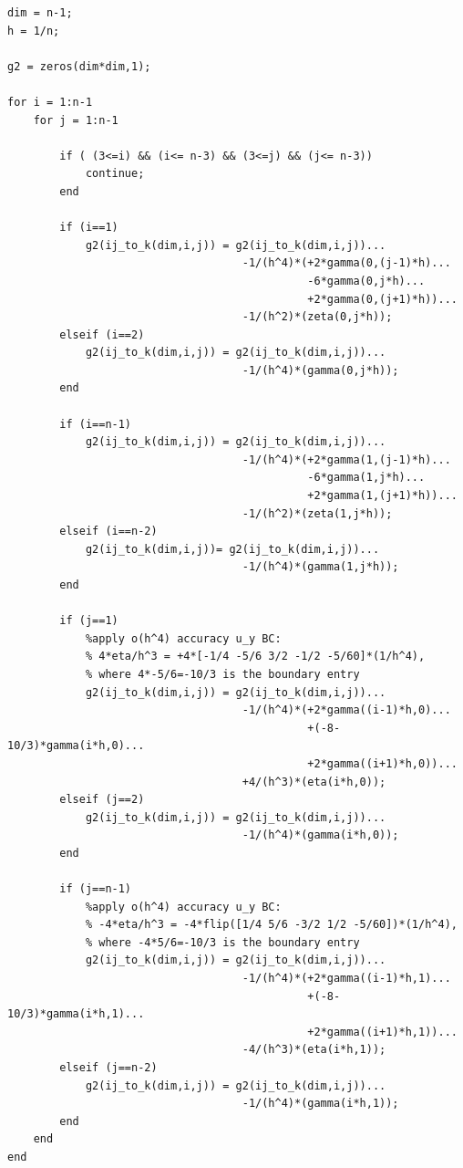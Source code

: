 \documentclass[12pt,letter]{article}
\begin{document}
\begin{enumerate}
\begin{enumerate}
\begin{verbatim}
dim = n-1;
h = 1/n;

g2 = zeros(dim*dim,1);

for i = 1:n-1
    for j = 1:n-1

        if ( (3<=i) && (i<= n-3) && (3<=j) && (j<= n-3))
            continue;
        end
        
        if (i==1)
            g2(ij_to_k(dim,i,j)) = g2(ij_to_k(dim,i,j))...
                                    -1/(h^4)*(+2*gamma(0,(j-1)*h)...
                                              -6*gamma(0,j*h)...
                                              +2*gamma(0,(j+1)*h))...
                                    -1/(h^2)*(zeta(0,j*h));
        elseif (i==2)
            g2(ij_to_k(dim,i,j)) = g2(ij_to_k(dim,i,j))...
                                    -1/(h^4)*(gamma(0,j*h));
        end
        
        if (i==n-1)
            g2(ij_to_k(dim,i,j)) = g2(ij_to_k(dim,i,j))...
                                    -1/(h^4)*(+2*gamma(1,(j-1)*h)...
                                              -6*gamma(1,j*h)...
                                              +2*gamma(1,(j+1)*h))...
                                    -1/(h^2)*(zeta(1,j*h));
        elseif (i==n-2)
            g2(ij_to_k(dim,i,j))= g2(ij_to_k(dim,i,j))...
                                    -1/(h^4)*(gamma(1,j*h));
        end
        
        if (j==1)
            %apply o(h^4) accuracy u_y BC: 
            % 4*eta/h^3 = +4*[-1/4 -5/6 3/2 -1/2 -5/60]*(1/h^4), 
            % where 4*-5/6=-10/3 is the boundary entry
            g2(ij_to_k(dim,i,j)) = g2(ij_to_k(dim,i,j))...
                                    -1/(h^4)*(+2*gamma((i-1)*h,0)...
                                              +(-8-10/3)*gamma(i*h,0)...
                                              +2*gamma((i+1)*h,0))...
                                    +4/(h^3)*(eta(i*h,0));
        elseif (j==2)
            g2(ij_to_k(dim,i,j)) = g2(ij_to_k(dim,i,j))...
                                    -1/(h^4)*(gamma(i*h,0));
        end

        if (j==n-1)
            %apply o(h^4) accuracy u_y BC:
            % -4*eta/h^3 = -4*flip([1/4 5/6 -3/2 1/2 -5/60])*(1/h^4), 
            % where -4*5/6=-10/3 is the boundary entry
            g2(ij_to_k(dim,i,j)) = g2(ij_to_k(dim,i,j))...
                                    -1/(h^4)*(+2*gamma((i-1)*h,1)...
                                              +(-8-10/3)*gamma(i*h,1)...
                                              +2*gamma((i+1)*h,1))...
                                    -4/(h^3)*(eta(i*h,1));
        elseif (j==n-2)
            g2(ij_to_k(dim,i,j)) = g2(ij_to_k(dim,i,j))...
                                    -1/(h^4)*(gamma(i*h,1));
        end
    end
end


\end{verbatim}
\end{enumerate}
\end{enumerate}
\end{document}
